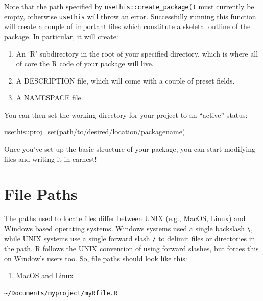 \documentclass[
]{book}
\newenvironment{Shaded}{\begin{snugshade}}{\end{snugshade}}
\newcommand{\FunctionTok}[1]{\textcolor[rgb]{0.00,0.00,0.00}{#1}}
\newcommand{\NormalTok}[1]{#1}
\newcommand{\SpecialCharTok}[1]{\textcolor[rgb]{0.00,0.00,0.00}{#1}}
\newcommand{\StringTok}[1]{\textcolor[rgb]{0.31,0.60,0.02}{#1}}
\providecommand{\tightlist}{%
  \setlength{\itemsep}{0pt}\setlength{\parskip}{0pt}}
\begin{document}
Note that the path specified by \texttt{usethis::create\_package()} must currently be empty, otherwise \texttt{usethis} will throw an error. Successfully running this function will create a couple of important files which constitute a skeletal outline of the package. In particular, it will create:

\begin{enumerate}
\def\labelenumi{\arabic{enumi}.}
\tightlist
\item
  An `R' subdirectory in the root of your specified directory, which is where all of core the R code of your package will live.
\item
  A DESCRIPTION file, which will come with a couple of preset fields.
\item
  A NAMESPACE file.
\end{enumerate}

You can then set the working directory for your project to an ``active'' status:

\begin{Shaded}
\begin{Highlighting}[]
\NormalTok{usethis}\SpecialCharTok{::}\FunctionTok{proj\_set}\NormalTok{(}\StringTok{\textquotesingle{}path/to/desired/location/packagename\textquotesingle{}}\NormalTok{)}
\end{Highlighting}
\end{Shaded}

Once you've set up the basic structure of your package, you can start modifying files and writing it in earnest!

\hypertarget{file-paths}{%
\section{File Paths}\label{file-paths}}

The paths used to locate files differ between UNIX (e.g., MacOS, Linux) and Windows based operating systems. Windows systems used a single backslash \texttt{\textbackslash{}}, while UNIX systems use a single forward slash \texttt{/} to delimit files or directories in the path. R follows the UNIX convention of using forward slashes, but forces this on Window's users too. So, file paths should look like this:

\begin{enumerate}
\def\labelenumi{\arabic{enumi}.}
\tightlist
\item
  MacOS and Linux
\end{enumerate}

\texttt{\textasciitilde{}/Documents/myproject/myRfile.R}
\end{document}
